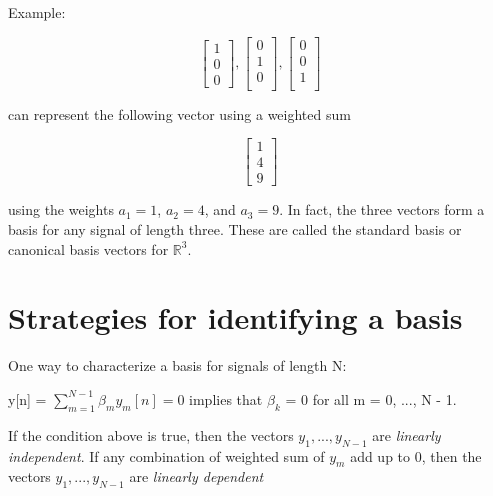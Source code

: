 \documentclass[11pt]{article}
\begin{document}
\vspace{4mm}

Example:
\begin{center}
\[
\begin{bmatrix}
   1        \\
    0      \\
   0          
\end{bmatrix}
,
\begin{bmatrix}
      0        \\
    1      \\
   0       \\    
\end{bmatrix}
,
\begin{bmatrix}
   0        \\
    0     \\
   1    \\
    
\end{bmatrix}
\]
\end{center}
 
can represent the following vector using a weighted sum

\begin{center}
\[
\begin{bmatrix}
   1        \\
    4      \\
   9          
\end{bmatrix}
\]
\end{center}

using the weights $a_1 = 1$, $a_2 = 4$, and $a_3 = 9$. In fact, the three vectors form a  basis for any signal of length three. These are called the standard basis or canonical basis vectors for $\mathbb{R}^3$.

\section{Strategies for identifying a basis}
One way to characterize a basis for signals of length N:

\vspace{3mm}

\begin{center}
y[n] = $\sum\limits_{m = 1}^{N-1} \beta_m y_m[n] = 0$ implies that $\beta_k$ = 0 for all m = 0, ..., N - 1.
\end{center}

\vspace{3mm}

If the condition above is true, then the vectors $y_1, ..., y_{N-1}$ are \emph{linearly independent}. If any combination of weighted sum of $y_m$ add up to 0, then the vectors $y_1, ..., y_{N-1}$ are \emph{linearly dependent}
\end{document}
